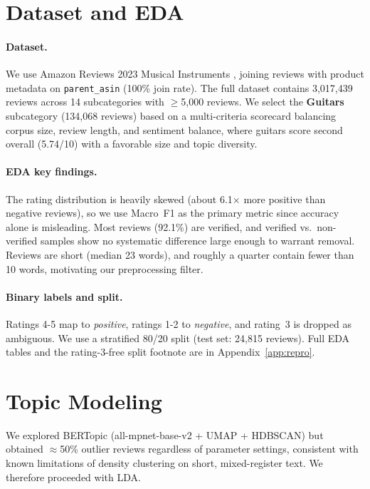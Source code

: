 \documentclass[11pt]{article}
\begin{document}
\section{Dataset and EDA}
\label{sec:data}

\paragraph{Dataset.}
We use Amazon Reviews 2023 Musical Instruments
\cite{hou2024bridging}, joining reviews with product metadata on
\texttt{parent\_asin} (100\% join rate).
The full dataset contains 3{,}017{,}439 reviews across 14
subcategories with $\geq$5{,}000 reviews.
We select the \textbf{Guitars} subcategory (134{,}068 reviews)
based on a multi-criteria scorecard balancing corpus size,
review length, and sentiment balance, where guitars score second
overall (5.74/10) with a favorable size and topic diversity.

\paragraph{EDA key findings.}
The rating distribution is heavily skewed (about 6.1$\times$ more
positive than negative reviews), so we use Macro~F1 as the primary
metric since accuracy alone is misleading.
Most reviews (92.1\%) are verified, and verified vs.\ non-verified
samples show no systematic difference large enough to warrant
removal.
Reviews are short (median 23 words), and roughly a quarter contain
fewer than 10 words, motivating our preprocessing filter.

\paragraph{Binary labels and split.}
Ratings 4-5 map to \textit{positive}, ratings 1-2 to
\textit{negative}, and rating~3 is dropped as ambiguous.
We use a stratified 80/20 split (test set: 24{,}815 reviews).
Full EDA tables and the rating-3-free split footnote are in
Appendix~\ref{app:repro}.

\section{Topic Modeling}
\label{sec:topics}

We explored BERTopic \cite{grootendorst2022bertopic}
(all-mpnet-base-v2 + UMAP + HDBSCAN) but obtained $\approx$50\%
outlier reviews regardless of parameter settings, consistent with
known limitations of density clustering on short, mixed-register
text.
We therefore proceeded with LDA.
\end{document}
